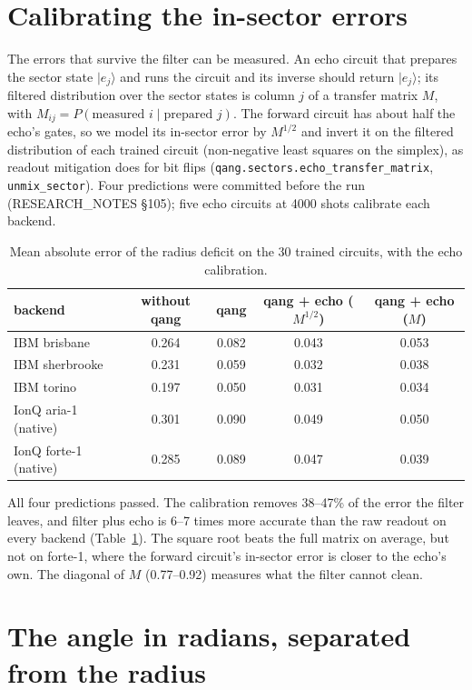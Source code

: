 \documentclass[11pt]{article}
\begin{document}
\section{Calibrating the in-sector errors}

The errors that survive the filter can be measured. An echo circuit that prepares the sector state $|e_j\rangle$ and
runs the circuit and its inverse should return $|e_j\rangle$; its filtered distribution over the sector states is column
$j$ of a transfer matrix $M$, with $M_{ij}=P(\text{measured }i\mid\text{prepared }j)$. The forward circuit has about half
the echo's gates, so we model its in-sector error by $M^{1/2}$ and invert it on the filtered distribution of each
trained circuit (non-negative least squares on the simplex), as readout mitigation does for bit flips
(\texttt{qang.sectors.echo\_transfer\_matrix}, \texttt{unmix\_sector}). Four predictions were committed before the run
(RESEARCH\_NOTES \S105); five echo circuits at 4000 shots calibrate each backend.

\begin{table}[h]
\centering\small
\begin{tabular}{lcccc}
\toprule
backend & without qang & qang & qang + echo ($M^{1/2}$) & qang + echo ($M$) \\
\midrule
IBM brisbane & 0.264 & 0.082 & 0.043 & 0.053 \\
IBM sherbrooke & 0.231 & 0.059 & 0.032 & 0.038 \\
IBM torino & 0.197 & 0.050 & 0.031 & 0.034 \\
IonQ aria-1 (native) & 0.301 & 0.090 & 0.049 & 0.050 \\
IonQ forte-1 (native) & 0.285 & 0.089 & 0.047 & 0.039 \\
\bottomrule
\end{tabular}
\caption{Mean absolute error of the radius deficit on the 30 trained circuits, with the echo calibration.}
\label{tab:echo}
\end{table}

All four predictions passed. The calibration removes 38--47\% of the error the filter leaves, and filter plus echo is
6--7 times more accurate than the raw readout on every backend (Table~\ref{tab:echo}). The square root beats the full
matrix on average, but not on forte-1, where the forward circuit's in-sector error is closer to the echo's own. The
diagonal of $M$ (0.77--0.92) measures what the filter cannot clean.

\section{The angle in radians, separated from the radius}\label{sec:angle}
\end{document}
